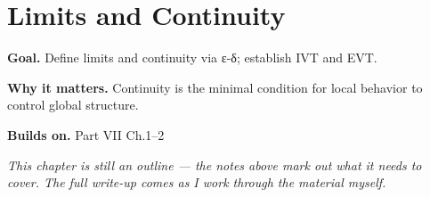 \chapter{Limits and Continuity}
\label{ch:07-real-analysis-and-measure-theory-03}

\begin{chapterintro}
\textbf{Goal.} Define limits and continuity via ε-δ; establish IVT and EVT.

\textbf{Why it matters.} Continuity is the minimal condition for local behavior to control global structure.

\textbf{Builds on.} Part VII Ch.1–2
\end{chapterintro}

\textit{This chapter is still an outline --- the notes above mark out what it needs to cover. The full write-up comes as I work through the material myself.}
